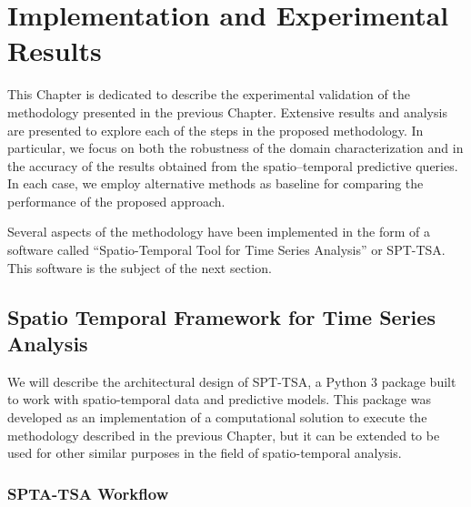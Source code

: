 \chapter{Implementation and Experimental Results}
\label{chapter_Experimental_Results}

This Chapter is dedicated to describe the experimental validation of the methodology presented in the previous Chapter. Extensive results and analysis are presented to explore each of the steps in the proposed methodology. In particular, we focus on both the robustness of the domain characterization and in the accuracy of the results obtained from the spatio--temporal predictive queries. In each case, we employ alternative methods as baseline for comparing the performance of the proposed approach.

Several aspects of the methodology have been implemented in the form of a software called ``Spatio-Temporal Tool for Time Series Analysis'' or SPT-TSA. This software is the subject of the next section.


\section{Spatio Temporal Framework for Time Series Analysis}       
We will describe the architectural design of SPT-TSA, a Python 3 package built to work with spatio-temporal data and predictive models. This package was developed as an implementation of a computational solution to execute the methodology described in the previous Chapter, but it can be extended to be used for other similar purposes in the field of spatio-temporal analysis.


\subsection{SPTA-TSA Workflow}

